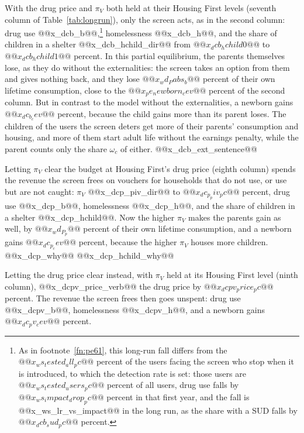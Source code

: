 \documentclass[10pt]{article}
\begin{document}
With the drug price and $\pi_V$ both held at their Housing First levels (seventh column of Table~\ref{tab:longrun}), only the screen acts, as in the second column: drug use @@x_dcb_b@@,\footnote{As in footnote~\ref{fn:pe61}, this long-run fall differs from the $@@x_ws_tested_all_pc@@$ percent of the users facing the screen who stop when it is introduced, to which the detection rate is set: those users are $@@x_ws_tested_users_pc@@$ percent of all users, drug use falls by $@@x_ws_impact_drop_pc@@$ percent in that first year, and the fall is @@x_ws_lr_vs_impact@@ in the long run, as the share with a SUD falls by $@@x_dcb_sud_pc@@$ percent.} homelessness @@x_dcb_h@@, and the share of children in a shelter @@x_dcb_hchild_dir@@ from $@@x_dcb_hchild0@@$ to $@@x_dcb_hchild1@@$ percent. In this partial equilibrium, the parents themselves lose, as they do without the externalities: the screen takes an option from them and gives nothing back, and they lose $@@x_wd_Pabs_b@@$ percent of their own lifetime consumption, close to the $@@x_pe_newborn_cev@@$ percent of the second column. But in contrast to the model without the externalities, a newborn gains $@@x_dc_b_cev@@$ percent, because the child gains more than its parent loses. The children of the users the screen deters get more of their parents' consumption and housing, and more of them start adult life without the earnings penalty, while the parent counts only the share $\omega_c$ of either. @@x_dcb_ext_sentence@@

Letting $\pi_V$ clear the budget at Housing First's drug price (eighth column) spends the revenue the screen frees on vouchers for households that do not use, or use but are not caught: $\pi_V$ @@x_dcp_piv_dir@@ to $@@x_dc_p_piv_pc@@$ percent, drug use @@x_dcp_b@@, homelessness @@x_dcp_h@@, and the share of children in a shelter @@x_dcp_hchild@@. Now the higher $\pi_V$ makes the parents gain as well, by $@@x_wd_P_p@@$ percent of their own lifetime consumption, and a newborn gains $@@x_dc_p_cev@@$ percent, because the higher $\pi_V$ houses more children. @@x_dcp_why@@ @@x_dcp_hchild_why@@

Letting the drug price clear instead, with $\pi_V$ held at its Housing First level (ninth column), @@x_dcpv_price_verb@@ the drug price by $@@x_dcpv_price_pc@@$ percent. The revenue the screen frees then goes unspent: drug use @@x_dcpv_b@@, homelessness @@x_dcpv_h@@, and a newborn gains $@@x_dc_pv_cev@@$ percent.
\end{document}
